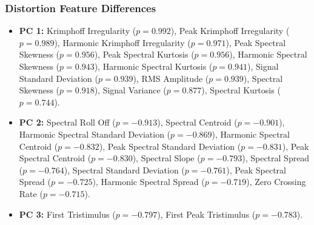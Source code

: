 		\subsubsection*{Distortion Feature Differences}
			\begin{itemize}
				\item {\bf{PC 1:}} Krimphoff Irregularity ($p = 0.992$), Peak Krimphoff Irregularity ($p =
					0.989$), Harmonic Krimphoff Irregularity ($p = 0.971$), Peak Spectral Skewness ($p =
					0.956$), Peak Spectral Kurtosis ($p = 0.956$), Harmonic Spectral Skewness ($p =
					0.943$), Harmonic Spectral Kurtosis ($p = 0.941$), Signal Standard Deviation ($p =
					0.939$), RMS Amplitude ($p = 0.939$), Spectral Skewness ($p = 0.918$), Signal
					Variance ($p = 0.877$), Spectral Kurtosis ($p = 0.744$).
				\item {\bf{PC 2:}} Spectral Roll Off ($p = -0.913$), Spectral Centroid ($p = -0.901$),
					Harmonic Spectral Standard Deviation ($p = -0.869$), Harmonic Spectral Centroid ($p
					= -0.832$), Peak Spectral Standard Deviation ($p = -0.831$), Peak Spectral Centroid
					($p = -0.830$), Spectral Slope ($p = -0.793$), Spectral Spread ($p = -0.764$),
					Spectral Standard Deviation ($p = -0.761$), Peak Spectral Spread ($p = -0.725$),
					Harmonic Spectral Spread ($p = -0.719$), Zero Crossing Rate ($p = -0.715$).
				\item {\bf{PC 3:}} First Tristimulus ($p = -0.797$), First Peak Tristimulus ($p = -0.783$).
			\end{itemize}

